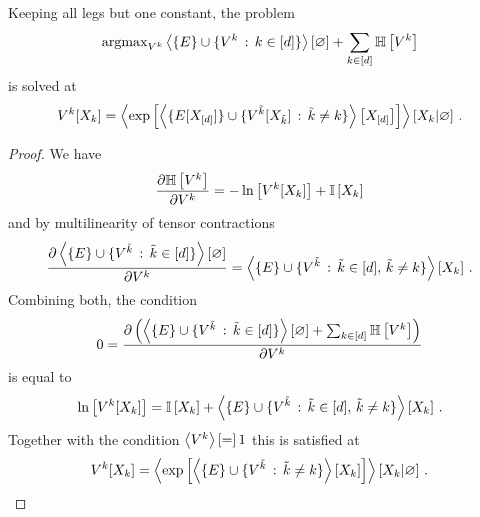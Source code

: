 \begin{theorem}
	Keeping all legs but one constant, the problem
	\begin{align*}
		\mathrm{argmax}_{V^{k}} \left\langle \{E\} \cup \{V^{k} \, : \, k\in[d]\}\right\rangle \left[ \varnothing \right]
		+ \sum_{k\in[d]} \mathbb{H}\left[V^{k}\right] 
	\end{align*}
	is solved at 
		\[ V^{k}[X_{k}] 
			= \left\langle  \mathrm{exp}\left[ \left\langle  \{E[X_{[d]}] \}\cup
				\{V^{\tilde{k}}[X_{\tilde{k}}] \, : \, \tilde{k}\neq k\} \right\rangle \left[ X_{[d]} \right] \right]
			\right\rangle \left[ X_{k} | \varnothing \right] \, . \]
\end{theorem}
\begin{proof}
	We have
	\begin{align*}
		 \frac{\partial \mathbb{H}\left[V^{k}\right]}{\partial V^{k}}
		=  - \ln \left[ V^{k}[X_{k}] \right]
		+ \mathbb{I}\left[X_{k}\right]
	\end{align*}
	and by multilinearity of tensor contractions
	\begin{align*}
		\frac{\partial \left\langle \{E\}\cup\{V^{\tilde{k}} \, : \, \tilde{k}\in[d] \}\right\rangle \left[ \varnothing \right]}{\partial V^{k}}
		=  \left\langle \{E\}\cup\{V^{\tilde{k}} \, : \, \tilde{k}\in[d] ,\, \tilde{k}\neq k \}\right\rangle \left[ X_{k} \right] \, . 
	\end{align*}
	Combining both, the condition
	\begin{align*}
		0 = \frac{\partial 
			\left( \left\langle \{E\}\cup\{V^{\tilde{k}} \, : \, \tilde{k}\in[d] \}\right\rangle \left[ \varnothing \right] + \sum_{k\in[d]} \mathbb{H}\left[V^{k}\right] \right)
		}{\partial V^{k}}
	\end{align*}
	is equal to
	\begin{align*}
		\ln \left[ V^{k}[X_{k}] \right] =
		 \mathbb{I}\left[X_{k}\right] + \left\langle \{E\}\cup\{V^{\tilde{k}} \, : \, \tilde{k}\in[d] ,\, \tilde{k}\neq k \}\right\rangle \left[ X_{k} \right] \, .
	\end{align*}
	Together with the condition $\left\langle V^{k}\right\rangle \left[ = \right]1$ this is satisfied at
		\[ V^{k}[X_{k}] 
			= \left\langle  \mathrm{exp}\left[ \left\langle  \{E\}\cup
				\{V^{\tilde{k}} \, : \, \tilde{k}\neq k\} \right\rangle \left[ X_{k} \right] \right]
			\right\rangle \left[ X_{k} | \varnothing \right] \, . \]
\end{proof}



